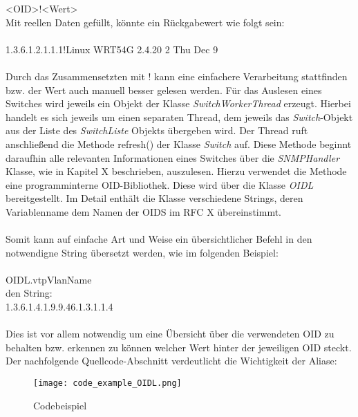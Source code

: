 <OID>!<Wert>\\

Mit reellen Daten gefüllt, könnte ein Rückgabewert wie folgt sein:\\
\\
1.3.6.1.2.1.1.1!Linux WRT54G 2.4.20 2 Thu Dec 9\\
\\
Durch das Zusammensetzten mit ! kann eine einfachere Verarbeitung stattfinden bzw. der Wert auch manuell besser gelesen werden.
Für das Auslesen eines Switches wird jeweils ein Objekt der Klasse \textit{SwitchWorkerThread} erzeugt. Hierbei handelt es sich jeweils um einen separaten Thread, dem jeweils das \textit{Switch}-Objekt aus der Liste des \textit{SwitchListe} Objekts übergeben wird.
Der Thread ruft anschließend die Methode refresh() der Klasse \textit{Switch} auf.
Diese Methode beginnt daraufhin alle relevanten Informationen eines Switches über die \textit{SNMPHandler} Klasse, wie in Kapitel X beschrieben, auszulesen.
Hierzu verwendet die Methode eine programminterne OID-Bibliothek. Diese wird über die Klasse \textit{OIDL} bereitgestellt. Im Detail enthält die Klasse verschiedene Strings, deren Variablenname dem Namen der OIDS im RFC X übereinstimmt.\\\\
Somit kann auf einfache Art und Weise ein übersichtlicher Befehl in den notwendigne String übersetzt werden, wie im folgenden Beispiel:\\
\\
OIDL.vtpVlanName\\
den String:\\
1.3.6.1.4.1.9.9.46.1.3.1.1.4\\
\\
Dies ist vor allem notwendig um eine Übersicht über die verwendeten OID zu behalten bzw. erkennen zu können welcher Wert hinter der jeweiligen OID steckt. Der nachfolgende Quellcode-Abschnitt verdeutlicht die Wichtigkeit der Aliase:\\

\begin{figure}[H]
\centering
\texttt{[image: code\_example\_OIDL.png]}
\caption{Codebeispiel}
\label{fig:classdiagramcode}
\end{figure}

